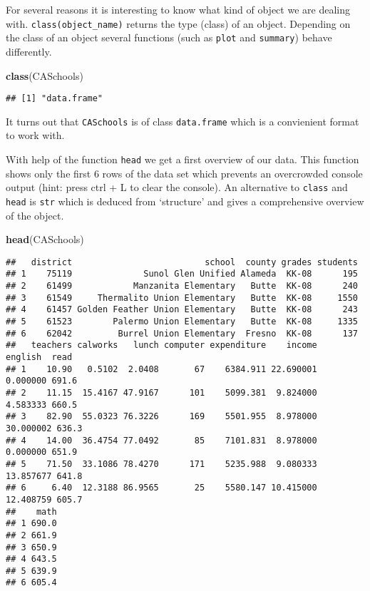 \documentclass[]{book}
\newenvironment{Shaded}{\begin{snugshade}}{\end{snugshade}}
\newcommand{\KeywordTok}[1]{\textcolor[rgb]{0.13,0.29,0.53}{\textbf{#1}}}
\newcommand{\NormalTok}[1]{#1}
\theoremstyle{definition}
\theoremstyle{definition}
\theoremstyle{definition}
\theoremstyle{remark}
\begin{document}
For several reasons it is interesting to know what kind of object we are
dealing with. \texttt{class(object\_name)} returns the type (class) of
an object. Depending on the class of an object several functions (such
as \texttt{plot} and \texttt{summary}) behave differently.

\begin{Shaded}
\begin{Highlighting}[]
\KeywordTok{class}\NormalTok{(CASchools)}
\end{Highlighting}
\end{Shaded}

\begin{verbatim}
## [1] "data.frame"
\end{verbatim}

It turns out that \texttt{CASchools} is of class \texttt{data.frame}
which is a convienient format to work with.

With help of the function \texttt{head} we get a first overview of our
data. This function shows only the first 6 rows of the data set which
prevents an overcrowded console output (hint: press ctrl + L to clear
the console). An alternative to \texttt{class} and \texttt{head} is
\texttt{str} which is deduced from `structure' and gives a comprehensive
overview of the object.

\begin{Shaded}
\begin{Highlighting}[]
\KeywordTok{head}\NormalTok{(CASchools)}
\end{Highlighting}
\end{Shaded}

\begin{verbatim}
##   district                          school  county grades students
## 1    75119              Sunol Glen Unified Alameda  KK-08      195
## 2    61499            Manzanita Elementary   Butte  KK-08      240
## 3    61549     Thermalito Union Elementary   Butte  KK-08     1550
## 4    61457 Golden Feather Union Elementary   Butte  KK-08      243
## 5    61523        Palermo Union Elementary   Butte  KK-08     1335
## 6    62042         Burrel Union Elementary  Fresno  KK-08      137
##   teachers calworks   lunch computer expenditure    income   english  read
## 1    10.90   0.5102  2.0408       67    6384.911 22.690001  0.000000 691.6
## 2    11.15  15.4167 47.9167      101    5099.381  9.824000  4.583333 660.5
## 3    82.90  55.0323 76.3226      169    5501.955  8.978000 30.000002 636.3
## 4    14.00  36.4754 77.0492       85    7101.831  8.978000  0.000000 651.9
## 5    71.50  33.1086 78.4270      171    5235.988  9.080333 13.857677 641.8
## 6     6.40  12.3188 86.9565       25    5580.147 10.415000 12.408759 605.7
##    math
## 1 690.0
## 2 661.9
## 3 650.9
## 4 643.5
## 5 639.9
## 6 605.4
\end{verbatim}
\end{document}
